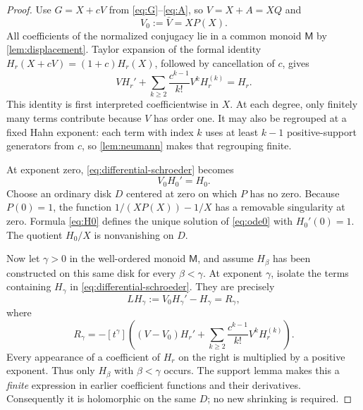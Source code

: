 \documentclass[11pt,letterpaper]{article}
\numberwithin{equation}{section}
\theoremstyle{plain}
\theoremstyle{definition}
\theoremstyle{remark}
\newcommand{\M}{\mathsf M}
\begin{document}
\begin{proof}
Use $G=X+cV$ from \eqref{eq:G}--\eqref{eq:A}, so $V=X+A=XQ$ and
\begin{equation}\label{eq:V0}
 V_0:=\bar V=XP(X).
\end{equation}
All coefficients of the normalized conjugacy lie in a common monoid $\M$
by \cref{lem:displacement}. Taylor expansion of the formal identity
$H_r(X+cV)=(1+c)H_r(X)$, followed by cancellation of $c$, gives
\begin{equation}\label{eq:differential-schroeder}
 V H_r'+\sum_{k\ge2}\frac{c^{k-1}}{k!}V^kH_r^{(k)}=H_r.
\end{equation}
This identity is first interpreted coefficientwise in $X$. At each degree,
only finitely many terms contribute because $V$ has order one. It may also
be regrouped at a fixed Hahn exponent: each term with index $k$ uses at
least $k-1$ positive-support generators from $c$, so
\cref{lem:neumann} makes that regrouping finite.

At exponent zero, \eqref{eq:differential-schroeder} becomes
\begin{equation}\label{eq:ode0}
 V_0H_0'=H_0.
\end{equation}
Choose an ordinary disk $D$ centered at zero on which $P$ has no zero.
Because $P(0)=1$, the function $1/(XP(X))-1/X$ has a removable
singularity at zero. Formula \eqref{eq:H0} defines the unique solution of
\eqref{eq:ode0} with $H_0'(0)=1$. The quotient $H_0/X$ is nonvanishing
on $D$.

Now let $\gamma>0$ in the well-ordered monoid $\M$, and assume
$H_\beta$ has been constructed on this same disk for every $\beta<\gamma$.
At exponent $\gamma$, isolate the terms containing $H_\gamma$ in
\eqref{eq:differential-schroeder}. They are precisely
\begin{equation}\label{eq:ode-gamma}
 L H_\gamma:=V_0H_\gamma'-H_\gamma=R_\gamma,
\end{equation}
where
\begin{equation}\label{eq:R-gamma}
 R_\gamma=-[t^\gamma]\left(
 (V-V_0)H_r'+
 \sum_{k\ge2}\frac{c^{k-1}}{k!}V^kH_r^{(k)}\right).
\end{equation}
Every appearance of a coefficient of $H_r$ on the right is multiplied by a
positive exponent. Thus only $H_\beta$ with $\beta<\gamma$ occurs. The
support lemma makes this a \emph{finite} expression in earlier coefficient
functions and their derivatives. Consequently it is holomorphic on the
same $D$; no new shrinking is required.


\end{proof}
\end{document}
